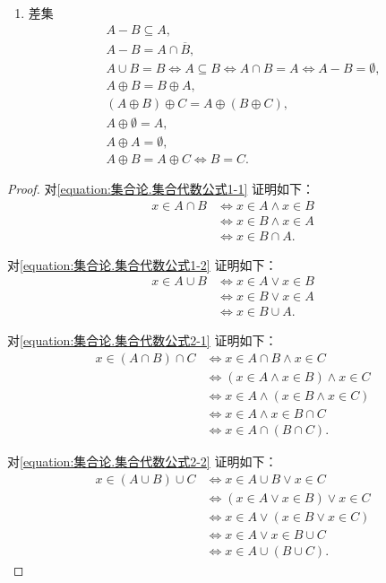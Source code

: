 \begin{property}
\begin{enumerate}
\item 差集
\begin{gather}
	A - B \subseteq A, \\
	A - B = A \cap \overline{B}, \\
	A \cup B = B \iff A \subseteq B \iff A \cap B = A \iff A - B = \emptyset, \\
	A \oplus B = B \oplus A, \\
	(A \oplus B) \oplus C = A \oplus (B \oplus C), \\
	A \oplus \emptyset = A, \\
	A \oplus A = \emptyset, \\
	A \oplus B = A \oplus C \iff B = C.
\end{gather}
\end{enumerate}
\begin{proof}
对\cref{equation:集合论.集合代数公式1-1} 证明如下：
\begin{align*}
	x \in A \cap B
	&\iff x \in A \land x \in B \\
	&\iff x \in B \land x \in A \\
	&\iff x \in B \cap A.
\end{align*}

对\cref{equation:集合论.集合代数公式1-2} 证明如下：
\begin{align*}
	x \in A \cup B
	&\iff x \in A \lor x \in B \\
	&\iff x \in B \lor x \in A \\
	&\iff x \in B \cup A.
\end{align*}

对\cref{equation:集合论.集合代数公式2-1} 证明如下：
\begin{align*}
	x \in (A \cap B) \cap C
	&\iff x \in A \cap B \land x \in C \\
	&\iff (x \in A \land x \in B) \land x \in C \\
	&\iff x \in A \land (x \in B \land x \in C) \\
	&\iff x \in A \land x \in B \cap C \\
	&\iff x \in A \cap (B \cap C).
\end{align*}

对\cref{equation:集合论.集合代数公式2-2} 证明如下：
\begin{align*}
	x \in (A \cup B) \cup C
	&\iff x \in A \cup B \lor x \in C \\
	&\iff (x \in A \lor x \in B) \lor x \in C \\
	&\iff x \in A \lor (x \in B \lor x \in C) \\
	&\iff x \in A \lor x \in B \cup C \\
	&\iff x \in A \cup (B \cup C).
\end{align*}


\end{proof}
\end{property}
